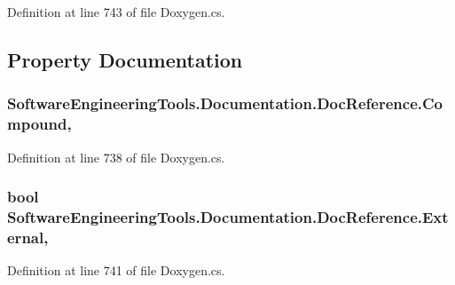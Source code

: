 Definition at line 743 of file Doxygen.\+cs.



\subsection{Property Documentation}
\hypertarget{class_software_engineering_tools_1_1_documentation_1_1_doc_reference_a694938b5ed042c68e220ba01e26bdaf0}{
\subsubsection[{Compound}]{ Software\+Engineering\+Tools.\+Documentation.\+Doc\+Reference.\+Compound\hspace{0.3cm}{\ttfamily [get]}, {\ttfamily [set]}}}\label{class_software_engineering_tools_1_1_documentation_1_1_doc_reference_a694938b5ed042c68e220ba01e26bdaf0}


Definition at line 738 of file Doxygen.\+cs.

\hypertarget{class_software_engineering_tools_1_1_documentation_1_1_doc_reference_a72107943dc98d2883e85b689994d7351}{
\subsubsection[{External}]{\setlength{\rightskip}{0pt plus 5cm}bool Software\+Engineering\+Tools.\+Documentation.\+Doc\+Reference.\+External\hspace{0.3cm}{\ttfamily [get]}, {\ttfamily [set]}}}\label{class_software_engineering_tools_1_1_documentation_1_1_doc_reference_a72107943dc98d2883e85b689994d7351}


Definition at line 741 of file Doxygen.\+cs.

